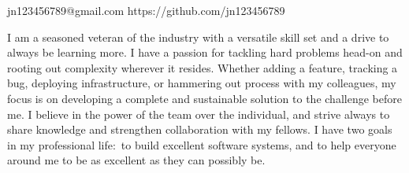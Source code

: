 \documentclass[10pt]{article}
\begin{document}
\sloppy



\sbull jn123456789@gmail.com
\sbull https://github.com/jn123456789



\spacedhrule{0.8em}{-0.4em}


\noindent I am a seasoned veteran of the industry with a versatile skill set and a drive to
always be learning more. I have a passion for tackling hard problems head-on and rooting out
complexity wherever it resides. Whether adding a feature, tracking a bug, deploying
infrastructure, or hammering out process with my colleagues, my focus is on developing a
complete and sustainable solution to the challenge before me.  I believe in the power of the
team over the individual, and strive always to share knowledge and strengthen collaboration with
my fellows. I have two goals in my professional life:\ to build excellent software systems, and
to help everyone around me to be as excellent as they can possibly be.


\spacedhrule{0.8em}{-0.4em}

\end{document}
